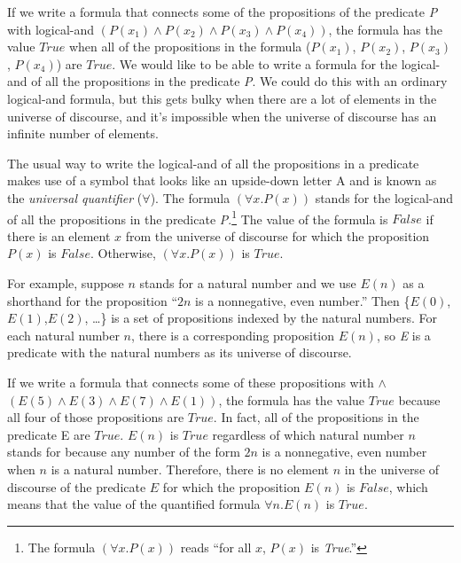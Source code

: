 {{If we write a formula that connects some of the propositions
of the predicate \emph{P} with logical-and
$(P(x_1) \wedge P(x_2) \wedge P(x_3) \wedge P(x_4))$,
the formula has the value $True$
when all of the propositions in the formula ($P(x_1)$, $P(x_2)$, $P(x_3)$, $P(x_4)$)
are $True$.
We would like to be able to write a formula
for the logical-and of all the propositions in the predicate \emph{P}.
We could do this with an ordinary logical-and formula,
but this gets bulky when there are a lot of elements
in the universe of discourse,
and it's impossible when the universe of discourse
has an infinite number of elements.

The usual way to write the logical-and of all the propositions in a predicate
makes use of a symbol that looks like an upside-down letter A
and is known as the
\label{def:universal-quantifier}\emph{universal quantifier} ($\forall$).
The  formula $(\forall x.P(x))$
stands for the logical-and of all the propositions in the predicate
\emph{P}.\footnote{The
formula $(\forall x. P(x))$ reads ``for all $x$, $P(x)$ is \emph{True}.''}
The value of the formula is $False$
if there is an element $x$ from the universe of discourse
for which the proposition $P(x)$ is $False$.
Otherwise, $(\forall x.P(x))$ is $True$.

For example, suppose $n$ stands for a natural number
and we use
$E(n)$ as a shorthand for the proposition ``$2n$ is a nonnegative, even number.''
Then \{$E(0)$, $E(1)$,$E(2)$, \dots\}
is a set of propositions indexed by the natural numbers.
For each natural number $n$, there is a corresponding proposition $E(n)$,
so \emph{E} is a predicate with the natural numbers
as its universe of discourse.

If we write a formula that connects some of these propositions with $\wedge$
$(E(5) \wedge E(3) \wedge E(7) \wedge E(1))$,
the formula has the value $True$
because all four of those propositions are $True$.
In fact, all of the propositions in the predicate E are $True$.
$E(n)$ is $True$ regardless of which natural number $n$ stands for
because any number of the form $2n$ is a nonnegative, even number
when $n$ is a natural number.
Therefore, there is no element $n$ in the universe of discourse of
the predicate $E$ for which the proposition $E(n)$ is $False$,
which means that the value of the quantified formula $\forall n.E(n)$
is $True$.

}}
